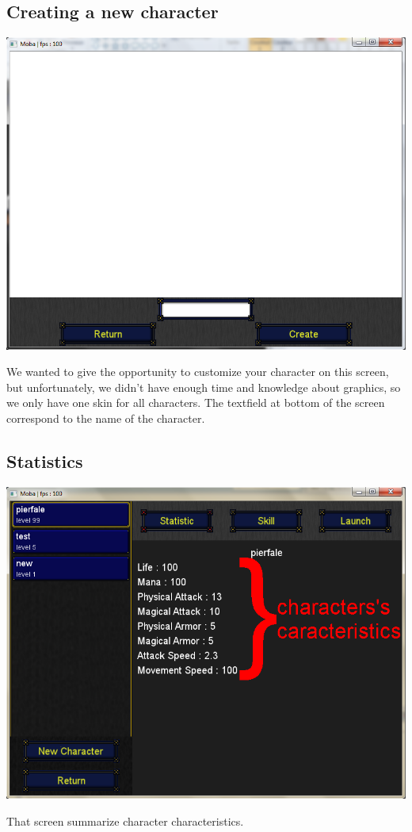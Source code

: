 \documentclass{scrreprt}
\begin{document}
		  \subsection{Creating a new character}
		  \begin{center}
		  \includegraphics[scale=0.4]{create_character.png}
		  \end{center}
		  We wanted to give the opportunity to customize your character on this screen, but unfortunately, we didn't have enough time and knowledge about graphics, so we only have one skin for all characters. The textfield at bottom of the screen correspond to the name of the character.
		  \subsection{Statistics}
		  \begin{center}
		  \includegraphics[scale=0.4]{stats_screen.png}
		  \end{center}
		  That screen summarize character characteristics.
\end{document}
